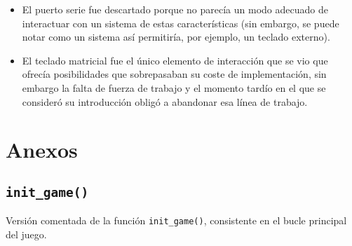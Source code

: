 \documentclass[12pt,letterpaper]{article}
\begin{document}
\begin{itemize}
\begin{itemize}

    \item El puerto serie fue descartado porque no parecía un modo
      adecuado de interactuar con un sistema de estas características
      (sin embargo, se puede notar como un sistema así permitiría, por
      ejemplo, un teclado externo).
    \item El teclado matricial fue el único elemento de interacción
      que se vio que ofrecía posibilidades que sobrepasaban su coste
      de implementación, sin embargo la falta de fuerza de trabajo y
      el momento tardío en el que se consideró su introducción obligó
      a abandonar esa línea de trabajo.
    \end{itemize}
\end{itemize}

\section{Anexos}
\label{sec:anexos}

\subsection{\texttt{init\_game()}}
\label{subsec:init-game}
Versión comentada de la función \texttt{init\_game()}, consistente en
el bucle principal del juego.
\end{document}
